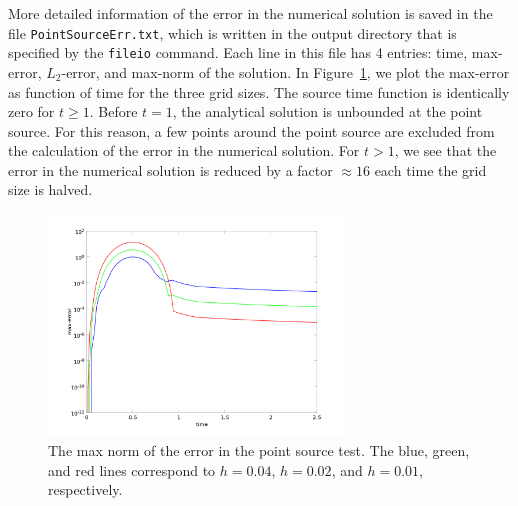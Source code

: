\documentclass[11pt]{report}
\begin{document}
More detailed information of the error in the numerical solution is saved in the file
\verb+PointSourceErr.txt+, which is written in the output directory that is specified by the
\verb+fileio+ command. Each line in this file has 4 entries: time, max-error, $L_2$-error, and
max-norm of the solution. In Figure~\ref{fig:point-error}, we plot the max-error as function of time
for the three grid sizes. The source time function is identically zero for $t\geq 1$. Before $t=1$,
the analytical solution is unbounded at the point source. For this reason, a few points around the
point source are excluded from the calculation of the error in the numerical solution. For $t>1$, we
see that the error in the numerical solution is reduced by a factor $\approx 16$ each time the grid
size is halved.
\begin{figure}[ht]
\begin{center}
\includegraphics[width=0.7\textwidth]{figures/ps-err.png}
\caption{The max norm of the error in the point source test. The blue, green, and red lines
  correspond to $h=0.04$, $h=0.02$, and $h=0.01$, respectively.}
\label{fig:point-error}
\end{center}
\end{figure}
\end{document}
